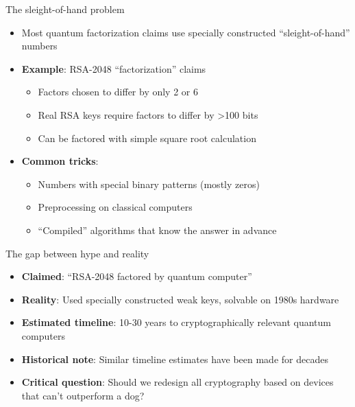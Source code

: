 \documentclass[aspectratio=169, lualatex, handout]{beamer}
\begin{document}
\begin{frame}{The sleight-of-hand problem}
	\begin{itemize}
		\item Most quantum factorization claims use specially constructed ``sleight-of-hand'' numbers
		\item \textbf{Example}: RSA-2048 ``factorization'' claims
		      \begin{itemize}
			      \item Factors chosen to differ by only 2 or 6
			      \item Real RSA keys require factors to differ by >100 bits
			      \item Can be factored with simple square root calculation
		      \end{itemize}
		\item \textbf{Common tricks}:
		      \begin{itemize}
			      \item Numbers with special binary patterns (mostly zeros)
			      \item Preprocessing on classical computers
			      \item ``Compiled'' algorithms that know the answer in advance
		      \end{itemize}
	\end{itemize}
\end{frame}

\begin{frame}{The gap between hype and reality}
	\begin{itemize}
		\item \textbf{Claimed}: ``RSA-2048 factored by quantum computer''
		\item \textbf{Reality}: Used specially constructed weak keys, solvable on 1980s hardware
		\item \textbf{Estimated timeline}: 10-30 years to cryptographically relevant quantum computers
		\item \textbf{Historical note}: Similar timeline estimates have been made for decades
		\item \textbf{Critical question}: Should we redesign all cryptography based on devices that can't outperform a dog?
	\end{itemize}
\end{frame}
\end{document}
